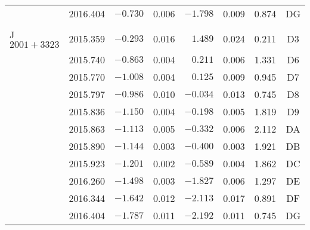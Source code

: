 \begin{table}[h]
\begin{tabular}{lrrrrrrc}
						&2016.404  & $-0.730$  &  0.006  & $-1.798$  &  0.009 & 0.874 & DG \\
						&&&&&&& \\ \hline
			J$2001+3323$
			            &2015.359  & $-0.293$  &  0.016  & $1.489$  &  0.024 & 0.211 & D3 \\
						&2015.740  & $-0.863$  &  0.004  & $ 0.211$  &  0.006 & 1.331 & D6 \\
						&2015.770  & $-1.008$  &  0.004  & $ 0.125$  &  0.009 & 0.945 & D7 \\
						&2015.797  & $-0.986$  &  0.010  & $-0.034$  &  0.013 & 0.745 & D8 \\
						&2015.836  & $-1.150$  &  0.004  & $-0.198$  &  0.005 & 1.819 & D9 \\
						&2015.863  & $-1.113$  &  0.005  & $-0.332$  &  0.006 & 2.112 & DA \\
						&2015.890  & $-1.144$  &  0.003  & $-0.400$  &  0.003 & 1.921 & DB \\
						&2015.923  & $-1.201$  &  0.002  & $-0.589$  &  0.004 & 1.862 & DC \\
						&2016.260  & $-1.498$  &  0.003  & $-1.827$  &  0.006 & 1.297 & DE \\
						&2016.344  & $-1.642$  &  0.012  & $-2.113$  &  0.017 & 0.891 & DF \\
						&2016.404  & $-1.787$  &  0.011  & $-2.192$  &  0.011 & 0.745 & DG \\
			\bottomrule
		\end{tabular}
	\end{table} 
        

